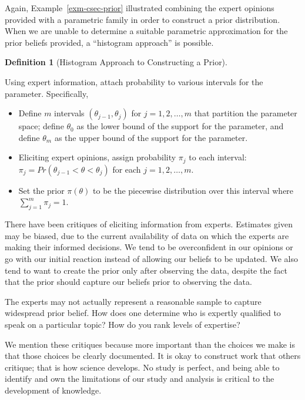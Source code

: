 \documentclass[
  letterpaper,
  DIV=11,
  numbers=noendperiod]{scrreprt}
\providecommand{\tightlist}{%
  \setlength{\itemsep}{0pt}\setlength{\parskip}{0pt}}\usepackage{longtable,booktabs,array}
\theoremstyle{definition}
\theoremstyle{definition}
\newtheorem{definition}{Definition}[chapter]
\theoremstyle{plain}
\theoremstyle{remark}
\begin{document}
Again, Example~\ref{exm-csec-prior} illustrated combining the expert
opinions provided with a parametric family in order to construct a prior
distribution. When we are unable to determine a suitable parametric
approximation for the prior beliefs provided, a ``histogram approach''
is possible.

\begin{definition}[Histogram Approach to Constructing a
Prior]\protect\hypertarget{def-histogram-prior}{}\label{def-histogram-prior}

Using expert information, attach probability to various intervals for
the parameter. Specifically,

\begin{itemize}
\tightlist
\item
  Define \(m\) intervals \(\left(\theta_{j-1}, \theta_j\right)\) for
  \(j = 1, 2, \dotsc, m\) that partition the parameter space; define
  \(\theta_0\) as the lower bound of the support for the parameter, and
  define \(\theta_m\) as the upper bound of the support for the
  parameter.
\item
  Eliciting expert opinions, assign probability \(\pi_j\) to each
  interval: \(\pi_j = Pr\left(\theta_{j-1} < \theta < \theta_j\right)\)
  for each \(j = 1, 2, \dotsc, m\).
\item
  Set the prior \(\pi(\theta)\) to be the piecewise distribution over
  this interval where \(\sum_{j=1}^{m} \pi_j = 1\).
\end{itemize}

\end{definition}

There have been critiques of eliciting information from experts.
Estimates given may be biased, due to the current availability of data
on which the experts are making their informed decisions. We tend to be
overconfident in our opinions or go with our initial reaction instead of
allowing our beliefs to be updated. We also tend to want to create the
prior only after observing the data, despite the fact that the prior
should capture our beliefs prior to observing the data.

The experts may not actually represent a reasonable sample to capture
widespread prior belief. How does one determine who is expertly
qualified to speak on a particular topic? How do you rank levels of
expertise?

We mention these critiques because more important than the choices we
make is that those choices be clearly documented. It is okay to
construct work that others critique; that is how science develops. No
study is perfect, and being able to identify and own the limitations of
our study and analysis is critical to the development of knowledge.
\end{document}
